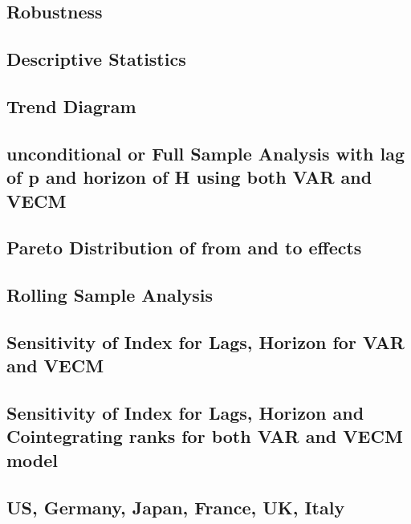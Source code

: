 \documentclass[]{elsarticle} %
\begin{document}
\subsection{Robustness}\label{robustness}

\subsection{Descriptive Statistics}\label{descriptive-statistics}

\subsection{Trend Diagram}\label{trend-diagram}

\subsection{unconditional or Full Sample Analysis with lag of p and
horizon of H using both VAR and
VECM}\label{unconditional-or-full-sample-analysis-with-lag-of-p-and-horizon-of-h-using-both-var-and-vecm}

\subsection{Pareto Distribution of from and to
effects}\label{pareto-distribution-of-from-and-to-effects}

\subsection{Rolling Sample Analysis}\label{rolling-sample-analysis}

\subsection{Sensitivity of Index for Lags, Horizon for VAR and
VECM}\label{sensitivity-of-index-for-lags-horizon-for-var-and-vecm}

\subsection{Sensitivity of Index for Lags, Horizon and Cointegrating
ranks for both VAR and VECM
model}\label{sensitivity-of-index-for-lags-horizon-and-cointegrating-ranks-for-both-var-and-vecm-model}

\subsection{US, Germany, Japan, France, UK,
Italy}\label{us-germany-japan-france-uk-italy}
\end{document}
